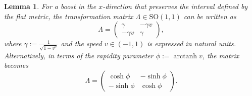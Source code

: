 \documentclass{amsart}
\newtheorem{lemma}[theorem]{Lemma}
\theoremstyle{definition}
\theoremstyle{remark}
\DeclareMathOperator{\arctanh}{arctanh}
\begin{document}
\begin{lemma}\label{lem:boost_x_direction_so11}
  For a boost in the $x$-direction that preserves the interval defined by the flat metric, the transformation matrix $\Lambda\in\mathrm{SO}(1,1)$ can be written as
  \begin{equation*}
    \Lambda =
    \begin{pmatrix}
      \gamma & -\gamma v \\
      -\gamma v & \gamma
    \end{pmatrix},
  \end{equation*}
  where $\gamma := \frac{1}{\sqrt{1 - v^2}}$ and the \emph{speed} $v \in (-1,1)$ is expressed in natural units.
  Alternatively, in terms of the \emph{rapidity} parameter $\phi := \arctanh v$, the matrix becomes
  \begin{equation*}
    \Lambda =
    \begin{pmatrix}
      \cosh \phi & -\sinh \phi \\
      -\sinh \phi & \cosh \phi
    \end{pmatrix}.
  \end{equation*}
\end{lemma}
\end{document}
